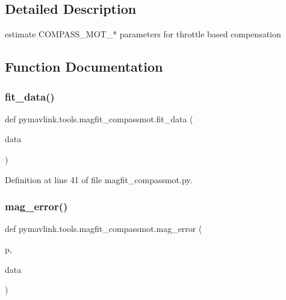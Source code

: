 \subsection{Detailed Description}
\begin{DoxyVerb}estimate COMPASS_MOT_* parameters for throttle based compensation
\end{DoxyVerb}
 

\subsection{Function Documentation}
\mbox{\label{namespacepymavlink_1_1tools_1_1magfit__compassmot_a32d23384645c90665aa534be4601f5f6}} 
\subsubsection{\texorpdfstring{fit\_data()}{fit\_data()}}
{\footnotesize\ttfamily def pymavlink.\+tools.\+magfit\+\_\+compassmot.\+fit\+\_\+data (\begin{DoxyParamCaption}\item[{}]{data }\end{DoxyParamCaption})}



Definition at line 41 of file magfit\+\_\+compassmot.\+py.

\mbox{\label{namespacepymavlink_1_1tools_1_1magfit__compassmot_aef60c4b23f3dd9f2d641a0ab945a42c0}} 
\subsubsection{\texorpdfstring{mag\_error()}{mag\_error()}}
{\footnotesize\ttfamily def pymavlink.\+tools.\+magfit\+\_\+compassmot.\+mag\+\_\+error (\begin{DoxyParamCaption}\item[{}]{p,  }\item[{}]{data }\end{DoxyParamCaption})}



